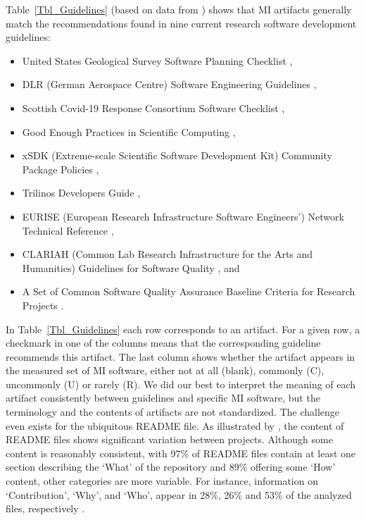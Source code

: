 \documentclass[11pt]{article}
\begin{document}
Table~\ref{Tbl_Guidelines} (based on data from \citep{SmithAndMichalski2022})
shows that MI artifacts generally match the recommendations found in nine
current research software development guidelines:
\begin{itemize}
\item United States Geological Survey Software Planning Checklist
\citep{USGS2019},
\item DLR (German Aerospace Centre) Software Engineering Guidelines
\citep{TobiasEtAl2018}, 
\item Scottish Covid-19 Response Consortium Software Checklist
\citep{BrettEtAl2021},
\item Good Enough Practices in Scientific Computing \citep{WilsonEtAl2016},
\item xSDK (Extreme-scale Scientific Software Development Kit) Community Package
Policies \citep{SmithAndRoscoe2018},
\item Trilinos Developers Guide \citep{HerouxEtAl2008},
\item EURISE (European Research Infrastructure Software Engineers') Network
Technical Reference \citep{ThielEtAl2020},
\item CLARIAH (Common Lab Research Infrastructure for the Arts and Humanities)
Guidelines for Software Quality \citep{vanGompelEtAl2016}, and
\item A Set of Common Software Quality Assurance Baseline Criteria for Research
Projects \citep{OrvizEtAl2017}.
\end{itemize}

In Table~\ref{Tbl_Guidelines} each row corresponds to an artifact.  For a given
row, a checkmark in one of the columns means that the corresponding guideline
recommends this artifact.  The last column shows whether the artifact appears in
the measured set of MI software, either not at all (blank), commonly (C),
uncommonly (U) or rarely (R).  We did our best to interpret the meaning of each
artifact consistently between guidelines and specific MI software, but the
terminology and the contents of artifacts are not standardized.  The challenge
even exists for the ubiquitous README file.  As illustrated by
\citet{PranaEtAl2018}, the content of README files shows significant variation
between projects.  Although some content is reasonably consistent, with 97\% of
README files contain at least one section describing the `What' of the
repository and 89\% offering some `How' content, other categories are more
variable.  For instance, information on `Contribution', `Why', and `Who',
appear in 28\%, 26\% and 53\% of the analyzed files, respectively
\citep{PranaEtAl2018}.  
\end{document}
